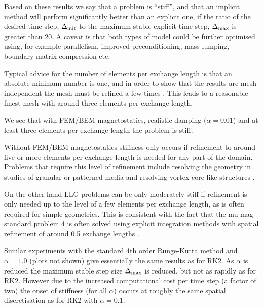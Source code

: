 Based on these results we say that a problem is ``stiff'', and that an implicit method will perform significantly better than an explicit one, if the ratio of the desired time step, $\Delta_{\text{init}}$ to the maximum stable explicit time step, $\Delta_{\text{max}}$ is greater than 20.
A caveat is that both types of model could be further optimised using, for example parallelism, improved preconditioning, mass lumping, boundary matrix compression \cite[Sec. 3]{Knittel2011} etc.

Typical advice for the number of elements per exchange length is that an absolute minimum number is one, and in order to show that the results are mesh independent the mesh must be refined a few times \cite[Sec. 11]{nmag-manual}.
This leads to a reasonable finest mesh with around three elements per exchange length.

We see that with FEM/BEM magnetostatics, realistic damping ($\alpha = 0.01$) and at least three elements per exchange length the problem is stiff.

Without FEM/BEM magnetostatics stiffness only occurs if refinement to around five or more elements per exchange length is needed for any part of the domain.
Problems that require this level of refinement include resolving the geometry in studies of granular or patterned media \cite{Suess2002} and resolving vortex-core-like structures \cite{Andreas2014}.

On the other hand LLG problems can be only moderately stiff if refinement is only needed up to the level of a few elements per exchange length, as is often required for simple geometries.
This is consistent with the fact that the mu-mag standard problem 4 is often solved using explicit integration methods with spatial refinement of around 0.5 exchange lengths \cite{mumag-website}.

Similar experiments with the standard 4th order Runge-Kutta method \cite[41]{Iserles2009} and $\alpha=1.0$ (plots not shown) give essentially the same results as for RK2. As $\alpha$ is reduced the maximum stable step size $\Delta_{\text{max}}$ is reduced, but not as rapidly as for RK2. However due to the increased computational cost per time step (a factor of two) the onset of stiffness (for all $\alpha$) occurs at roughly the same spatial discretisation as for RK2 with $\alpha = 0.1$.

